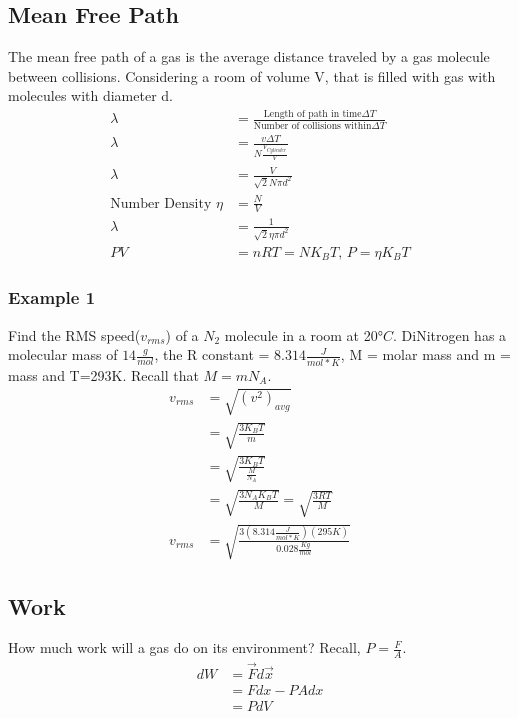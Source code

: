 	\subsection{Mean Free Path}
	The mean free path of a gas is the average distance traveled by a gas molecule between collisions. Considering a room of volume V, that is filled with gas with molecules with diameter d.
	\begin{align*}
	\lambda &= \frac{\text{Length of path in time}\Delta T}{\text{Number of collisions within}\Delta T}\\
	\lambda &= \frac{v \Delta T}{N\frac{V_{Cylinder}}{V}}\\
	\lambda &= \frac{V}{\sqrt{2}N\pi d^2}\\
	\text{Number Density } \eta &= \frac{N}{V}\\
	\lambda &=\frac{1}{\sqrt{2}\eta \pi d^2}\\
	PV &= nRT = NK_BT \text{, } P=\eta K_BT
	\end{align*}
	\subsubsection{Example 1}
	Find the RMS speed($v_{rms}$) of a $N_2$ molecule in a room at 20$\si{\degree}C$. DiNitrogen has a molecular mass of $14\frac{g}{mol}$, the R constant = $8.314\frac{J}{mol*K}$, M = molar mass and m = mass and T=293K.
	Recall that $M=mN_A$.
	\begin{align*}
	v_{rms}&=\sqrt{(v^2)_{avg}}\\
	&=\sqrt{\frac{3K_BT}{m}}\\
	&=\sqrt{\frac{3K_BT}{\frac{M}{N_A}}}\\
	&=\sqrt{\frac{3N_AK_BT}{M}}=\sqrt{\frac{3RT}{M}}\\
	v_{rms}&=\sqrt{\frac{3\left(8.314\frac{J}{mol*K}\right)(295K)}{0.028\frac{Kg}{mol}}}
	\end{align*}


	\subsection{Work}
	How much work will a gas do on its environment? Recall, $P=\frac{F}{A}$.
	\begin{align*}
	dW&=\vec{F}d\vec{x}\\
	&=Fdx-PAdx\\
	&=PdV
	\end{align*}
